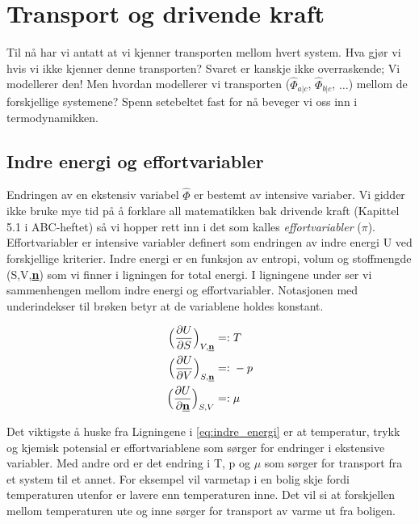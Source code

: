 \clearpage
\section{Transport og drivende kraft}\label{sec:transport_effort}
Til nå har vi antatt at vi kjenner transporten mellom hvert system. Hva gjør vi hvis vi ikke kjenner denne transporten? Svaret er kanskje ikke overraskende; Vi modellerer den! Men hvordan modellerer vi transporten ($\hat{\Phi}_{a|c}$, $\hat{\Phi}_{b|c}$, $\dots$) mellom de forskjellige systemene? Spenn setebeltet fast for nå beveger vi oss inn i termodynamikken.

\subsection{Indre energi og effortvariabler}\label{sec:indre_effort} Endringen av en ekstensiv variabel $\hat{\Phi}$ er bestemt av intensive variaber. Vi gidder ikke bruke mye tid på å forklare all matematikken bak drivende kraft (Kapittel 5.1 i ABC-heftet) så vi hopper rett inn i det som kalles \textit{effortvariabler} ($\pi$). Effortvariabler er intensive variabler definert som endringen av indre energi U ved forskjellige kriterier. Indre energi er en funksjon av entropi, volum og stoffmengde (S,V,\underline{\textbf{n}}) som vi finner i ligningen for total energi. I ligningene under ser vi sammenhengen mellom indre energi og effortvariabler.  Notasjonen med underindekser til brøken betyr at de variablene holdes konstant.

\begin{equation}
\label{eq:indre_energi}
\begin{split}
\Big(\frac{\partial U}{\partial S}\Big)_{V,\underline{\textbf{n}}} =:&\hspace{0.1cm} T \\
\Big(\frac{\partial U}{\partial V}\Big)_{S,\underline{\textbf{n}}} =:&\hspace{0.1cm} -p \\
\Big(\frac{\partial U}{\partial \underline{\textbf{n}}}\Big)_{S,V} =:&\hspace{0.1cm} \mu
\end{split}
\end{equation}

Det viktigste å huske fra Ligningene i \ref{eq:indre_energi} er at temperatur, trykk og kjemisk potensial er effortvariablene som sørger for endringer i ekstensive variabler. Med andre ord er det endring i T, p og $\mu$ som sørger for transport fra et system til et annet. For eksempel vil varmetap i en bolig skje fordi temperaturen utenfor er lavere enn temperaturen inne. Det vil si at forskjellen mellom temperaturen ute og inne sørger for transport av varme ut fra boligen. 


